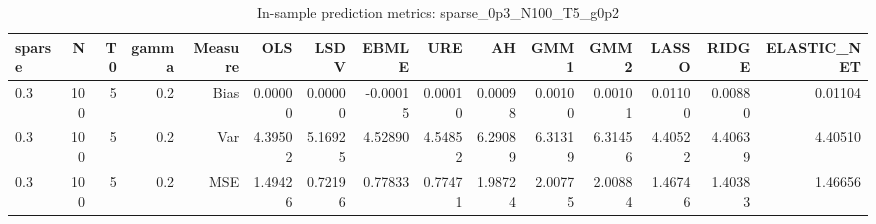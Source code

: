 \begin{table}[!htbp]\centering
\caption{In-sample prediction metrics: sparse_0p3_N100_T5_g0p2}
\label{tab:table2_sparse_0p3_N100_T5_g0p2}
\begin{tabular}{lrrrrrrrrrrrrrr}
\hline
sparse & N & T0 & gamma & Measure & OLS & LSDV & EBMLE & URE & AH & GMM1 & GMM2 & LASSO & RIDGE & ELASTIC_NET \\
\hline
0.3 & 100 & 5 & 0.2 & Bias & 0.00000 & 0.00000 & -0.00015 & 0.00010 & 0.00098 & 0.00100 & 0.00101 & 0.01100 & 0.00880 & 0.01104 \\
0.3 & 100 & 5 & 0.2 & Var & 4.39502 & 5.16925 & 4.52890 & 4.54852 & 6.29089 & 6.31319 & 6.31456 & 4.40522 & 4.40639 & 4.40510 \\
0.3 & 100 & 5 & 0.2 & MSE & 1.49426 & 0.72196 & 0.77833 & 0.77471 & 1.98724 & 2.00775 & 2.00884 & 1.46746 & 1.40383 & 1.46656 \\
\hline
\end{tabular}
\end{table}

